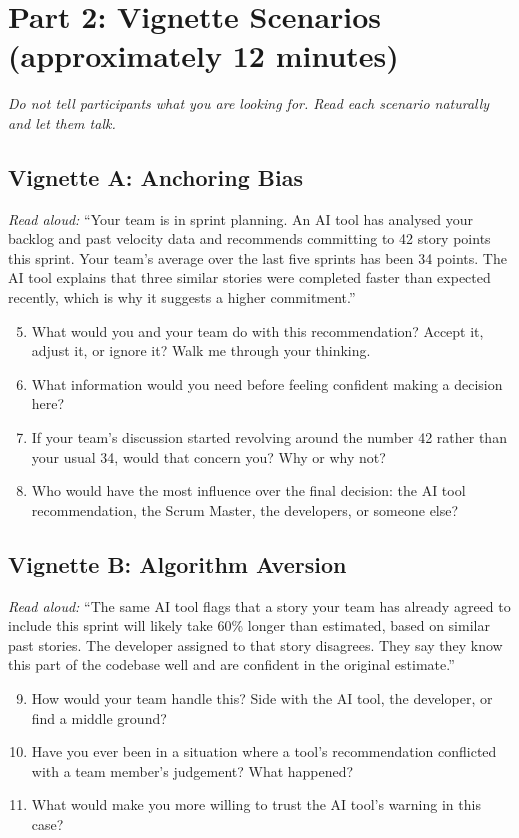 \documentclass[a4paper,twoside]{bth}
\begin{document}
\section*{Part 2: Vignette Scenarios (approximately 12 minutes)}

\textit{Do not tell participants what you are looking for. Read each scenario naturally and let them talk.}

\subsection*{Vignette A: Anchoring Bias}

\textit{Read aloud:} ``Your team is in sprint planning. An AI tool has analysed your backlog and past velocity data and recommends committing to 42 story points this sprint. Your team's average over the last five sprints has been 34 points. The AI tool explains that three similar stories were completed faster than expected recently, which is why it suggests a higher commitment.''

\begin{enumerate}
  \setcounter{enumi}{4}
  \item What would you and your team do with this recommendation? Accept it, adjust it, or ignore it? Walk me through your thinking.
  \item What information would you need before feeling confident making a decision here?
  \item If your team's discussion started revolving around the number 42 rather than your usual 34, would that concern you? Why or why not?
  \item Who would have the most influence over the final decision: the AI tool recommendation, the Scrum Master, the developers, or someone else?
\end{enumerate}

\subsection*{Vignette B: Algorithm Aversion}

\textit{Read aloud:} ``The same AI tool flags that a story your team has already agreed to include this sprint will likely take 60\% longer than estimated, based on similar past stories. The developer assigned to that story disagrees. They say they know this part of the codebase well and are confident in the original estimate.''

\begin{enumerate}
  \setcounter{enumi}{8}
  \item How would your team handle this? Side with the AI tool, the developer, or find a middle ground?
  \item Have you ever been in a situation where a tool's recommendation conflicted with a team member's judgement? What happened?
  \item What would make you more willing to trust the AI tool's warning in this case?
\end{enumerate}
\end{document}
